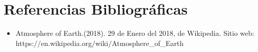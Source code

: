 \documentclass{article}
\begin{document}
\section{Referencias Bibliográficas}

\begin{itemize}
\item Atmosphere of Earth.(2018). 29 de Enero del 2018, de Wikipedia. Sitio web: \\
https:$//$en.wikipedia.org$/$wiki$/$Atmosphere\_of\_Earth
\end{itemize}
\end{document}
